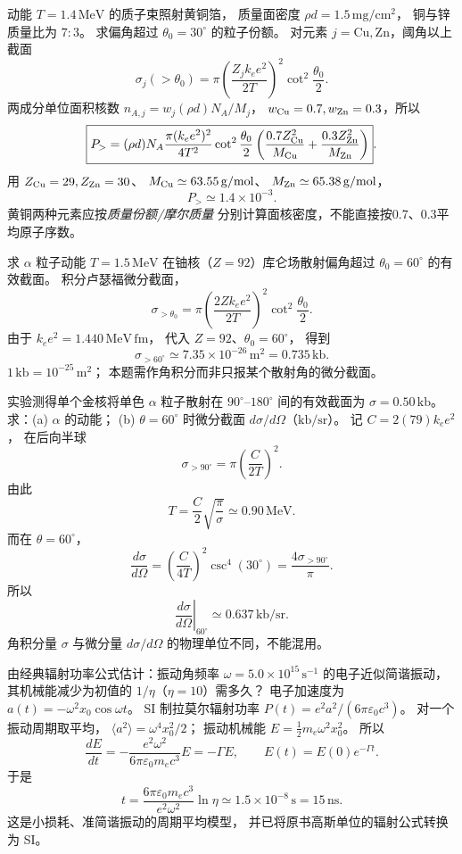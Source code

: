 动能 $T=1.4\,\mathrm{MeV}$ 的质子束照射黄铜箔，
质量面密度 $\rho d=1.5\,\mathrm{mg/cm^2}$，
铜与锌质量比为 $7:3$。
求偏角超过 $\theta_0=30^\circ$ 的粒子份额。
\exsolution
对元素 $j=\mathrm{Cu},\mathrm{Zn}$，阈角以上截面
\[
 \sigma_j(>\theta_0)=
 \pi\left(\frac{Z_jk_ee^2}{2T}\right)^2
 \cot^2\frac{\theta_0}{2}.
\]
两成分单位面积核数
$n_{A,j}=w_j(\rho d)N_A/M_j$，
$w_{\rm Cu}=0.7,w_{\rm Zn}=0.3$，所以
\[
 \boxed{P_>=(\rho d)N_A
 \frac{\pi(k_ee^2)^2}{4T^2}\cot^2\frac{\theta_0}{2}
 \left(\frac{0.7Z_{\rm Cu}^2}{M_{\rm Cu}}+
 \frac{0.3Z_{\rm Zn}^2}{M_{\rm Zn}}\right)}.
\]
用 $Z_{\rm Cu}=29,Z_{\rm Zn}=30$、
$M_{\rm Cu}\simeq63.55\,\mathrm{g/mol}$、
$M_{\rm Zn}\simeq65.38\,\mathrm{g/mol}$，
\[
 \boxed{P_>\simeq1.4\times10^{-3}}.
\]
\excheck 黄铜两种元素应按\emph{质量份额/摩尔质量}
分别计算面核密度，不能直接按0.7、0.3平均原子序数。

求 $\alpha$ 粒子动能 $T=1.5\,\mathrm{MeV}$
在铀核（$Z=92$）库仑场散射偏角超过
$\theta_0=60^\circ$ 的有效截面。
\exsolution
积分卢瑟福微分截面，
\[
 \boxed{\sigma_{>\theta_0}=
 \pi\left(\frac{2Zk_ee^2}{2T}\right)^2
 \cot^2\frac{\theta_0}{2}}.
\]
由于 $k_ee^2=1.440\,\mathrm{MeV\,fm}$，
代入 $Z=92$、$\theta_0=60^\circ$，
得到
\[
 \boxed{\sigma_{>60^\circ}\simeq
 7.35\times10^{-26}\,\mathrm{m^2}
 =0.735\,\mathrm{kb}}.
\]
\excheck $1\,\mathrm{kb}=10^{-25}\,\mathrm{m^2}$；
本题需作角积分而非只报某个散射角的微分截面。

实验测得单个金核将单色 $\alpha$ 粒子散射在
$90^\circ$--$180^\circ$ 间的有效截面为
$\sigma=0.50\,\mathrm{kb}$。
求：(a) $\alpha$ 的动能；
(b) $\theta=60^\circ$ 时微分截面
$d\sigma/d\Omega$（$\mathrm{kb/sr}$）。
\exsolution
记 $C=2(79)k_ee^2$，
在后向半球
\[
 \sigma_{>90^\circ}=
 \pi\left(\frac C{2T}\right)^2.
\]
由此
\[
 \boxed{T=\frac C2\sqrt{\frac{\pi}{\sigma}}
 \simeq0.90\,\mathrm{MeV}}.
\]
而在 $\theta=60^\circ$，
\[
 \frac{d\sigma}{d\Omega}
 =\left(\frac C{4T}\right)^2
 \csc^4(30^\circ)
 =\frac{4\sigma_{>90^\circ}}{\pi}.
\]
所以
\[
 \boxed{\left.\frac{d\sigma}{d\Omega}\right|_{60^\circ}
 \simeq0.637\,\mathrm{kb/sr}}.
\]
\excheck 角积分量 $\sigma$ 与微分量
$d\sigma/d\Omega$ 的物理单位不同，不能混用。

由经典辐射功率公式估计：振动角频率
$\omega=5.0\times10^{15}\,\mathrm{s^{-1}}$
的电子近似简谐振动，其机械能减少为初值的
$1/\eta$（$\eta=10$）需多久？
\exsolution
电子加速度为
$a(t)=-\omega^2x_0\cos\omega t$。
SI 制拉莫尔辐射功率
$P(t)=e^2a^2/(6\pi\varepsilon_0c^3)$。
对一个振动周期取平均，
$\langle a^2\rangle=\omega^4x_0^2/2$；
振动机械能 $E=\tfrac12m_e\omega^2x_0^2$。
所以
\[
 \frac{dE}{dt}=-\frac{e^2\omega^2}
 {6\pi\varepsilon_0m_ec^3}E
 =-\Gamma E,\qquad
 E(t)=E(0)e^{-\Gamma t}.
\]
于是
\[
 \boxed{t=\frac{6\pi\varepsilon_0m_ec^3}
 {e^2\omega^2}\ln\eta
 \simeq1.5\times10^{-8}\,\mathrm s=15\,\mathrm{ns}}.
\]
\excheck 这是小损耗、准简谐振动的周期平均模型，
并已将原书高斯单位的辐射公式转换为 SI。
